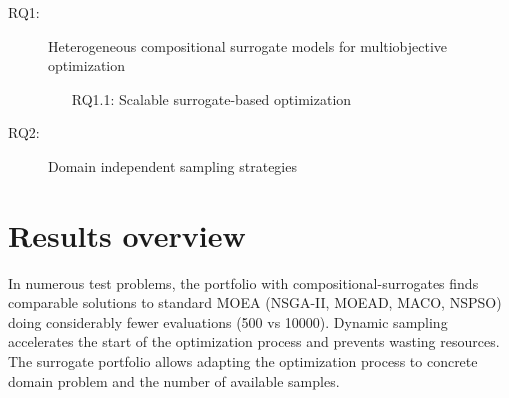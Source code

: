     \begin{description} 
        \item[RQ1:]\label{RG1} Heterogeneous compositional surrogate models for multiobjective optimization
        \begin{itemize}
            \item[RQ1.1:\label{RQ1.1}] Scalable surrogate-based optimization
        \end{itemize}
        \item[RQ2:]\label{RG2} Domain independent sampling strategies
    \end{description}

\section{Results overview}
    In numerous test problems, the portfolio with compositional-surrogates finds comparable solutions to standard MOEA (NSGA-II, MOEAD, MACO, NSPSO) doing considerably fewer evaluations (500 vs 10000). Dynamic sampling accelerates the start of the optimization process and prevents wasting resources. The surrogate portfolio allows adapting the optimization process to concrete domain problem and the number of available samples. 


